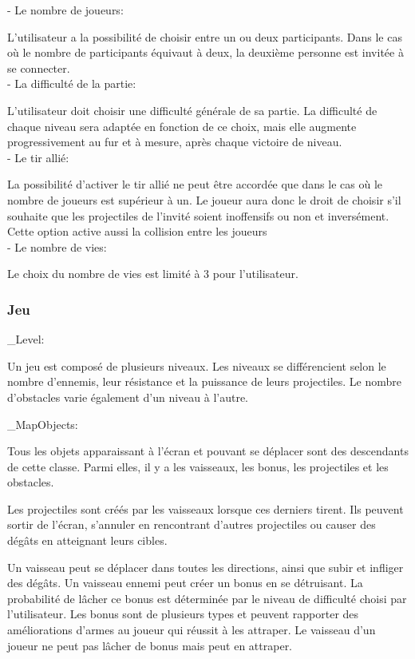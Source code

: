\documentclass[a4paper,12pt]{article}
\begin{document}
- Le nombre de joueurs: 

L'utilisateur a la possibilité de choisir entre un ou deux participants. Dans le cas où le nombre de participants équivaut à deux, la deuxième personne est invitée à se connecter.\\

- La difficulté de la partie:

 L'utilisateur doit choisir une difficulté générale de sa partie. La difficulté de chaque niveau sera adaptée en fonction de ce choix, mais elle augmente progressivement au fur et à mesure, après chaque victoire de niveau. \\

- Le tir allié: 

La possibilité d'activer le tir allié ne peut être accordée que dans le cas où le nombre de joueurs est supérieur à un.
Le joueur aura donc le droit de choisir s'il souhaite que les projectiles de l'invité soient inoffensifs ou non et inversément. Cette option active aussi la collision entre les joueurs  \\

- Le nombre de vies: 

Le choix du nombre de vies est limité à 3 pour l'utilisateur. \\

\subsubsection{Jeu}

\_Level:

Un jeu est composé de plusieurs niveaux. Les niveaux se différencient selon le nombre d'ennemis, leur résistance et la puissance de leurs projectiles. Le nombre d'obstacles varie également d'un niveau à l'autre.

\_MapObjects: 

Tous les objets apparaissant à l'écran et pouvant se déplacer sont des descendants de cette classe. 
Parmi elles, il y a les vaisseaux, les bonus, les projectiles et les obstacles. 

Les projectiles sont créés par les vaisseaux lorsque ces derniers tirent. Ils peuvent sortir de l'écran, s'annuler en rencontrant d'autres projectiles ou causer des dégâts en atteignant leurs cibles. 

Un vaisseau peut se déplacer dans toutes les directions, ainsi que subir et infliger des dégâts.
Un vaisseau ennemi peut créer un bonus en se détruisant. La probabilité de lâcher ce bonus est déterminée par le niveau de difficulté choisi par l'utilisateur. Les bonus sont de plusieurs types et peuvent rapporter des améliorations d'armes au joueur qui réussit à les attraper.
Le vaisseau d'un joueur ne peut pas lâcher de bonus mais peut en attraper.
\end{document}
